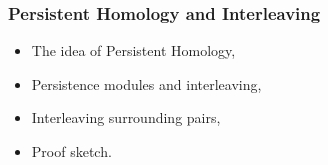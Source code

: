 
\begin{frame}
  \frametitle{Persistent Homology and Interleaving}

  \begin{itemize}
    \item The idea of Persistent Homology,
    \item Persistence modules and interleaving,
    \item Interleaving surrounding pairs,
    \item Proof sketch.
  \end{itemize}
\end{frame}
